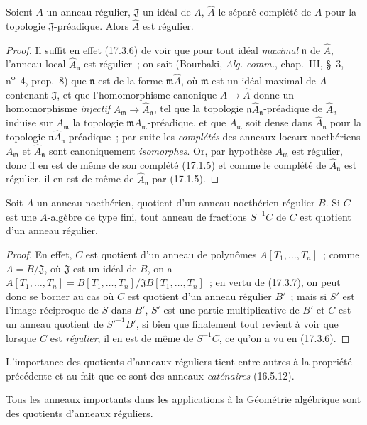 \begin{lemma}[17.3.8.1]
\label{0.17.3.8.1-fr}
Soient $A$ un anneau régulier, $\mathfrak{J}$ un idéal de $A$,
$\widehat{A}$ le séparé complété de $A$ pour la topologie
$\mathfrak{J}$-préadique. Alors $\widehat{A}$ est régulier.
\end{lemma}

\begin{proof}
Il suffit en effet (17.3.6) de voir que pour tout idéal \emph{maximal}
$\mathfrak{n}$ de $\widehat{A}$, l'anneau local
$\widehat{A}_{\mathfrak{n}}$ est régulier~; on sait (Bourbaki,
\emph{Alg. comm.}, chap.~III, \S~3, n\textsuperscript{o}~4, prop.~8) que
$\mathfrak{n}$
est de la forme $\mathfrak{m}\widehat{A}$, où $\mathfrak{m}$ est un idéal
maximal de $A$ contenant $\mathfrak{J}$, et que l'homomorphisme canonique
$A\to\widehat{A}$ donne un homomorphisme \emph{injectif}
$A_{\mathfrak{m}}\to\widehat{A}_{\mathfrak{n}}$, tel que la topologie
$\mathfrak{n}\widehat{A}_{\mathfrak{n}}$-préadique de
$\widehat{A}_{\mathfrak{n}}$ induise sur $A_{\mathfrak{m}}$ la topologie
$\mathfrak{m}A_{\mathfrak{m}}$-préadique, et que $A_{\mathfrak{m}}$ soit
dense dans $\widehat{A}_{\mathfrak{n}}$ pour la topologie
$\mathfrak{n}\widehat{A}_{\mathfrak{n}}$-préadique~; par suite les
\emph{complétés} des anneaux locaux noethériens $A_{\mathfrak{m}}$ et
$\widehat{A}_{\mathfrak{n}}$ sont canoniquement \emph{isomorphes}. Or, par
hypothèse $A_{\mathfrak{m}}$ est régulier, donc il en est de même de son
complété (17.1.5) et comme le complété de $\widehat{A}_{\mathfrak{n}}$ est
régulier, il en est de même de $\widehat{A}_{\mathfrak{n}}$ par (17.1.5).
\end{proof}

\begin{corollary}[17.3.9]
\label{0.17.3.9-fr}
Soit $A$ un anneau noethérien, quotient d'un anneau noethérien régulier $B$.
Si $C$ est une $A$-algèbre de type fini, tout anneau de fractions $S^{-1}C$
de $C$ est quotient d'un anneau régulier.
\end{corollary}

\begin{proof}
En effet, $C$ est quotient d'un anneau de polynômes $A[T_1,\ldots,T_n]$~;
comme $A=B/\mathfrak{J}$, où $\mathfrak{J}$ est un idéal de $B$, on a
$A[T_1,\ldots,T_n]=B[T_1,\ldots,T_n]/\mathfrak{J}B[T_1,\ldots,T_n]$~; en
vertu de (17.3.7), on peut donc se borner au cas où $C$ est quotient d'un
anneau régulier $B'$~; mais si $S'$ est l'image réciproque de $S$ dans $B'$,
$S'$ est une partie multiplicative de $B'$ et $C$ est un anneau quotient de
$S'^{-1}B'$, si bien que finalement tout revient à voir que lorsque $C$ est
\emph{régulier}, il en est de même de $S^{-1}C$, ce qu'on a vu en (17.3.6).
\end{proof}

L'importance des quotients d'anneaux réguliers tient entre autres à la
propriété précédente et au fait que ce sont des anneaux \emph{caténaires}
(16.5.12).

Tous les anneaux importants dans les applications à la Géométrie algébrique
sont des quotients d'anneaux réguliers.
